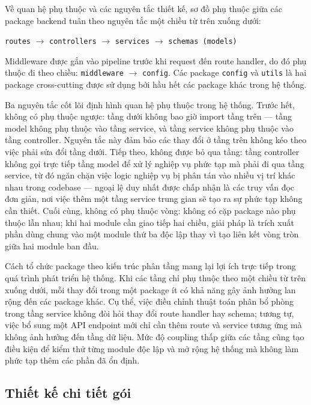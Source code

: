 ﻿\documentclass[a4paper,12pt,openany,oneside]{report}
\begin{document}
Về quan hệ phụ thuộc và các nguyên tắc thiết kế, sơ đồ phụ thuộc giữa các
package backend tuân theo nguyên tắc một chiều từ
trên xuống dưới:

\begin{center}
\texttt{routes} $\rightarrow$ \texttt{controllers} $\rightarrow$ \texttt{services} $\rightarrow$ \texttt{schemas (models)}
\end{center}

\noindent Middleware được gắn vào pipeline trước khi request đến route handler, do đó
phụ thuộc đi theo chiều: \texttt{middleware} $\rightarrow$ \texttt{config}.
Các package \texttt{config} và \texttt{utils} là hai package cross-cutting
được sử dụng bởi hầu hết các package khác trong hệ thống.

Ba nguyên tắc cốt lõi định hình quan hệ phụ thuộc trong hệ thống. Trước hết,
không có phụ thuộc ngược: tầng dưới không bao giờ import tầng trên --- tầng
model không phụ thuộc vào tầng service, và tầng service không phụ thuộc vào
tầng controller. Nguyên tắc này đảm bảo các thay đổi ở tầng trên không kéo
theo việc phải sửa đổi tầng dưới. Tiếp theo, không được bỏ qua tầng: tầng
controller không gọi trực tiếp tầng model để xử lý nghiệp vụ phức tạp mà phải
đi qua tầng service, từ đó ngăn chặn việc logic nghiệp vụ bị phân tán vào
nhiều vị trí khác nhau trong codebase --- ngoại lệ duy nhất được chấp nhận là
các truy vấn đọc đơn giản, nơi việc thêm một tầng service trung gian sẽ tạo ra
sự phức tạp không cần thiết. Cuối cùng, không có phụ thuộc vòng: không có cặp
package nào phụ thuộc lẫn nhau; khi hai module cần giao tiếp hai chiều, giải
pháp là trích xuất phần dùng chung vào một module thứ ba độc lập thay vì tạo
liên kết vòng tròn giữa hai module ban đầu.

Cách tổ chức package theo kiến trúc phân tầng mang lại lợi ích trực tiếp
trong quá trình phát triển hệ thống. Khi các tầng chỉ phụ thuộc theo một
chiều từ trên xuống dưới, mỗi thay đổi trong một package ít có khả năng gây
ảnh hưởng lan rộng đến các package khác. Cụ thể, việc điều chỉnh thuật toán
phân bổ phòng trong tầng service không đòi hỏi thay đổi route handler hay
schema; tương tự, việc bổ sung một API endpoint mới chỉ cần thêm route và
service tương ứng mà không ảnh hưởng đến tầng dữ liệu. Mức độ coupling thấp
giữa các tầng cũng tạo điều kiện để kiểm thử từng module độc lập và mở rộng
hệ thống mà không làm phức tạp thêm các phần đã ổn định.

\subsection{Thiết kế chi tiết gói}
\label{subsec:package_detail}
\end{document}
